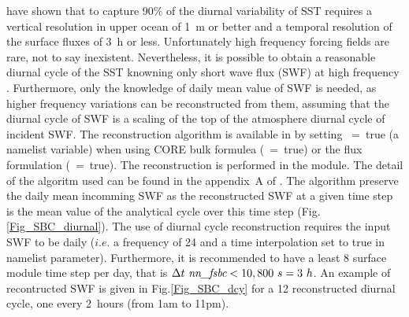 \cite{Bernie_al_JC05} have shown that to capture 90$\%$ of the diurnal variability of 
SST requires a vertical resolution in upper ocean of 1~m or better and a temporal resolution 
of the surface fluxes of 3~h or less. Unfortunately high frequency forcing fields are rare, 
not to say inexistent. Nevertheless, it is possible to obtain a reasonable diurnal cycle 
of the SST knowning only short wave flux (SWF) at high frequency \citep{Bernie_al_CD07}.
Furthermore, only the knowledge of daily mean value of SWF is needed, 
as higher frequency variations can be reconstructed from them, assuming that 
the diurnal cycle of SWF is a scaling of the top of the atmosphere diurnal cycle 
of incident SWF. The \cite{Bernie_al_CD07} reconstruction algorithm is available
in \NEMO by setting ~=~true (a \textit{} namelist variable) when using 
CORE bulk formulea (~=~true) or the flux formulation (~=~true). 
The reconstruction is performed in the  module. The detail of the algoritm used 
can be found in the appendix~A of \cite{Bernie_al_CD07}. The algorithm preserve the daily 
mean incomming SWF as the reconstructed SWF at a given time step is the mean value 
of the analytical cycle over this time step (Fig.\ref{Fig_SBC_diurnal}). 
The use of diurnal cycle reconstruction requires the input SWF to be daily 
($i.e.$ a frequency of 24 and a time interpolation set to true in  namelist parameter).
Furthermore, it is recommended to have a least 8 surface module time step per day,
that is  $\rdt \ \np{nn\_fsbc} < 10,800~s = 3~h$. An example of recontructed SWF 
is given in Fig.\ref{Fig_SBC_dcy} for a 12 reconstructed diurnal cycle, one every 2~hours 
(from 1am to 11pm).

